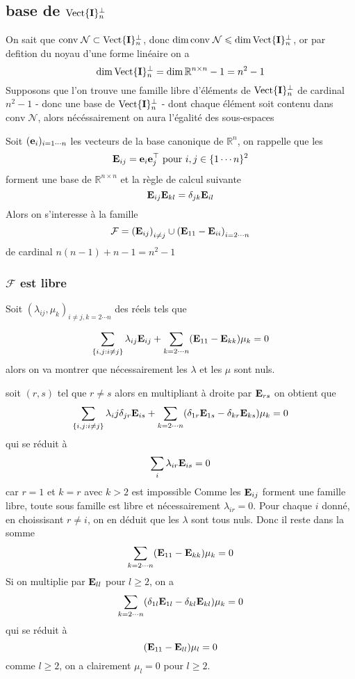 \documentclass[10pt]{article}
\newcommand{\R}{\mathbb{R}}
\newcommand{\conv}{\mathrm{conv} \;}
\newcommand{\matr}[2]{\R^{#1 \times #2}}
\newcommand{\nilp}{\mathcal{N}}
\newcommand{\trnul}{\mathrm{Vect}\{{\bf I}\}_n^{\bot}}
\newcommand{\tran}{^{\top}}
\newcommand{\ei}[1]{{\bf e}_{#1}}
\newcommand{\Eij}[1]{{\bf E}_{#1}}
\begin{document}
\subsection{base de $\trnul$}

On sait que $\conv \nilp \subset \trnul$, donc $\dim \conv \nilp \leqslant \dim \trnul$, or par defition du noyau d'une forme linéaire 
on a
$$
\dim \trnul = \dim \matr{n}{n} - 1  = n^2  - 1
$$
Supposons que l'on trouve une famille libre d'éléments de $\trnul$ de cardinal $n^2 - 1 $ -  donc une base de $\trnul$ - dont chaque élément
soit contenu dans $\conv \nilp$, alors nécéssairement on aura l'égalité des sous-espaces

Soit $(\ei{i})_{i=1\cdots n}$ les vecteurs de la base canonique de $\R^n$, on rappelle que les
$$
\Eij{ij} = \ei{i} \ei{j} \tran \mbox{ pour } i,j \in \{1 \cdots n\}^2
$$
forment une base de $\matr{n}{n}$  et la règle de calcul suivante
$$
\Eij{ij}\Eij{kl} = \delta_{jk}\Eij{il}
$$
Alors on s'interesse à la famille
$$
\mathcal{F} = \left(\Eij{ij}\right)_{i \neq j} \cup \left(\Eij{11}-\Eij{ii}\right)_{i=2\cdots n}
$$
de cardinal $n(n-1) + n-1 = n^2 -1$

\subsubsection{$\mathcal{F}$ est libre}

Soit $(\lambda_{ij}, \mu_k)_{ i \neq j, k=2\cdots n}$ des réels tels que 

$$
 \sum_{\{i,j : i \neq j\}} \lambda_{ij} \Eij{ij} + \sum_{k=2\cdots n} (\Eij{11} - \Eij{kk}) \mu_k = 0
$$
alors on va montrer que nécessairement les $\lambda$ et les $\mu$ sont nuls.\ 

soit $(r,s)$ tel que $r \neq s$ alors en multipliant à droite par $\Eij{rs}$ on obtient que 
$$
 \sum_{\{i,j : i \neq j\}} \lambda_ij \delta_{jr} \Eij{is} + \sum_{k=2\cdots n} (\delta_{1r}\Eij{1s} - \delta_{kr}\Eij{ks}) \mu_k = 0
$$
qui se réduit à 
$$
 \sum_{i} \lambda_{ir} \Eij{is} = 0
$$
car $r = 1$ et $k = r$ avec $k > 2$ est impossible
Comme les $\Eij{ij}$ forment une famille libre, toute sous famille est libre et nécessairement $\lambda_{ir} = 0$. Pour chaque $i$ donné,
en choissisant $r \neq i $, on en déduit que les $\lambda$ sont tous nuls. Donc il reste dans la somme
$$
 \sum_{k=2\cdots n} (\Eij{11} - \Eij{kk}) \mu_k = 0
$$
Si on multiplie par $\Eij{ll}$ pour $l \geqslant 2$, on a
$$
 \sum_{k=2\cdots n} (\delta_{1l}\Eij{1l} - \delta_{kl}\Eij{kl}) \mu_k = 0
$$
qui se réduit à
$$
 (\Eij{11} - \Eij{ll}) \mu_l = 0
$$
comme $l \geqslant 2$, on a clairement $\mu_l = 0$ pour $l \geqslant 2$.
\end{document}
